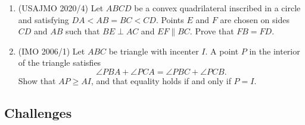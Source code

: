\begin{enumerate}
\begin{solu}
\begin{addsol}
{}
\end{addsol}
\end{solu}

\item (USAJMO 2020/4) Let $ABCD$ be a convex quadrilateral inscribed in a circle and satisfying $DA < AB = BC < CD$. Points $E$ and $F$ are chosen on sides $CD$ and $AB$ such that $BE \perp AC$ and $EF \parallel BC$. Prove that $FB = FD$.

\item (IMO 2006/1) Let $ABC$ be triangle with incenter $I$. A point $P$ in the interior of the triangle satisfies\[\angle PBA+\angle PCA = \angle PBC+\angle PCB.\]Show that $AP \geq AI$, and that equality holds if and only if $P=I$.

\end{enumerate}

\subsection{Challenges}


